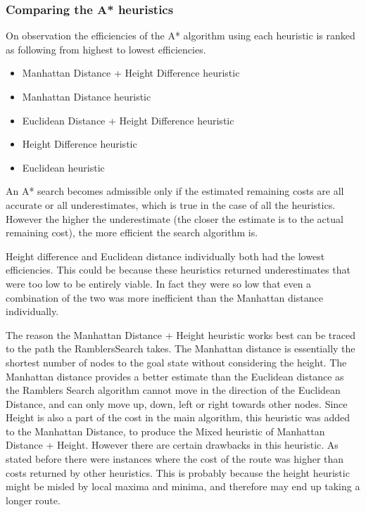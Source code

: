 \documentclass[11pt,oneside]{article}
\begin{document}
\subsubsection{Comparing the A* heuristics}
On observation the efficiencies of the A* algorithm using each heuristic is ranked as following from highest to lowest efficiencies.

\begin{itemize}
    \item Manhattan Distance + Height Difference heuristic
    \item Manhattan Distance heuristic
    \item Euclidean Distance + Height Difference heuristic
    \item Height Difference heuristic
    \item Euclidean heuristic
\end{itemize}

An A* search becomes admissible only if the estimated remaining costs are all accurate or all underestimates, which is true in the case of all the heuristics. However the higher the underestimate (the closer the estimate is to the actual remaining cost), the more efficient the search algorithm is.

Height difference and Euclidean distance individually both had the lowest efficiencies. This could be because these heuristics returned underestimates that were too low to be entirely viable. In fact they were so low that even a combination of the two was more inefficient than the Manhattan distance individually.

The reason the Manhattan Distance + Height heuristic works best can be traced to the path the RamblersSearch takes. The Manhattan distance is essentially the shortest number of nodes to the goal state without considering the height. The Manhattan distance provides a better estimate than the Euclidean distance as the Ramblers Search algorithm cannot move in the direction of the Euclidean Distance, and can only move up, down, left or right towards other nodes. Since Height is also a part of the cost in the main algorithm, this heuristic was added to the Manhattan Distance, to produce the Mixed heuristic of Manhattan Distance + Height. However there are certain drawbacks in this heuristic. As stated before there were instances where the cost of the route was higher than costs returned by other heuristics. This is probably because the height heuristic might be misled by local maxima and minima, and therefore may end up taking a longer route.
\end{document}
